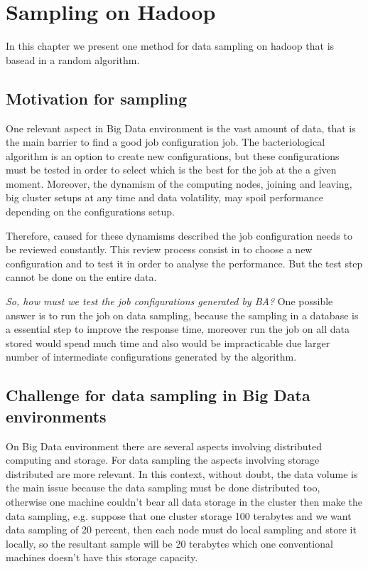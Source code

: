 \chapter{Sampling on Hadoop} %
\label{cha:sample}

In this chapter we present one method for data sampling on hadoop that is basead
in a random algorithm.

\section{Motivation for sampling}

One relevant aspect in Big Data environment is the vast amount of data,
that is the main barrier to find a good job configuration job. The bacteriological
algorithm is an option to create new configurations, but these configurations
must be tested in order to select which is the best for the job at the a given
moment. Moreover, the dynamism of the computing nodes, joining and leaving, big
cluster setups at any time and data volatility, may spoil performance depending
on the configurations setup. 

Therefore, caused for these dynamisms described the job configuration needs to be
reviewed constantly. This review process consist in to choose a new configuration
and to test it in order to analyse the performance. But the test step cannot be
done on the entire data.

{\it So, how must we test the job configurations generated by BA?} One possible
answer is to run the job on data sampling, because the sampling in a database is
a essential step to improve the response time, moreover run the job on all data
stored would spend much time and also would be impracticable due larger number
of intermediate configurations generated by the algorithm.

\section{Challenge for data sampling in Big Data environments}

On Big Data environment there are several aspects involving distributed computing
and storage. For data sampling the aspects involving storage distributed are more
relevant. In this context, without doubt, the data volume is the main issue because
the data sampling must be done distributed too, otherwise one machine couldn't bear
all data storage in the cluster then make the data sampling, e.g. suppose that
one cluster storage 100 terabytes and we want data sampling of 20 percent, then
each node must do local sampling and store it locally, so the resultant sample will
be 20 terabytes which one conventional machines doesn't have this storage capacity.

